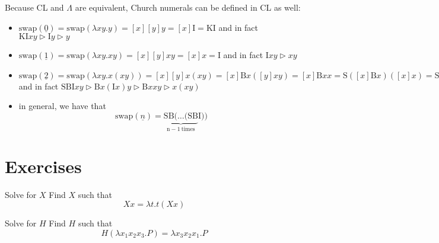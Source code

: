 \documentclass[a4paper, 12pt]{report}
\begin{document}
    Because CL and $\Lambda$ are equivalent, Church numerals can be defined in CL as well:

    \begin{itemize}
        \item $\mathrm{swap}(\underline 0) = \mathrm{swap}(\lambda xy. y) = [x] [y] y = [x] \mathrm I = \mathrm K \mathrm I$ and in fact $\mathrm K \mathrm I xy \triangleright \mathrm I y \triangleright y$
        \item $\mathrm{swap}(\underline 1) = \mathrm{swap}(\lambda xy.xy) = [x][y]xy = [x] x = \mathrm I$ and in fact $\mathrm I xy \triangleright xy$
        \item $\mathrm{swap}(\underline 2) = \mathrm{swap}(\lambda xy. x(xy)) = [x][y]x (xy) = [x]\mathrm B x([y]xy) = [x] \mathrm Bx x = \mathrm S([x] \mathrm Bx)([x]x) = \mathrm S \mathrm B \mathrm I $ and in fact $\mathrm S \mathrm B \mathrm I xy \triangleright \mathrm B x(\mathrm I x) y \triangleright \mathrm B xx y \triangleright x(xy)$
        \item in general, we have that $$\mathrm{swap}(\underline n) = \underbrace{\mathrm S \mathrm B( \ldots (\mathrm S \mathrm B}_{\mathrm{n - 1 \ times}} \mathrm I ))$$
    \end{itemize}

    \section{Exercises}

    \begin{framedprob}{Solve for $X$}
        Find $X$ such that $$Xx = \lambda t.t (Xx)$$
    \end{framedprob}
    
    
    \begin{framedprob}{Solve for $H$}
        Find $H$ such that $$H (\lambda x_1 x_2 x_3.P) = \lambda x_3 x_2 x_1 . P$$
    \end{framedprob}
\end{document}
